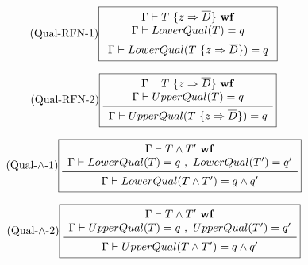 \vspace{0.4cm}

\begin{equation*}\tag{Qual-RFN-1}\label{equ-qual-rfn-1}
\boxed{
\begin{array}{c}
\Gamma \vdash T\ \{ z \Rightarrow \overline{D} \}\ {\bf wf} \\
\Gamma \vdash LowerQual(T) = q \\
\midrule
\Gamma \vdash LowerQual(T\ \{ z \Rightarrow \overline{D} \}) = q \\
\end{array}
}
\end{equation*}

\vspace{0.4cm}

\begin{equation*}\tag{Qual-RFN-2}\label{equ-qual-rfn-2}
\boxed{
\begin{array}{c}
\Gamma \vdash T\ \{ z \Rightarrow \overline{D} \}\ {\bf wf} \\
\Gamma \vdash UpperQual(T) = q \\
\midrule
\Gamma \vdash UpperQual(T\ \{ z \Rightarrow \overline{D} \}) = q \\
\end{array}
}
\end{equation*}

\vspace{0.4cm}

\begin{equation*}\tag{\mbox{Qual-$\land$-1}}\label{equ-qual-meet-1}
\boxed{
\begin{array}{c}
\Gamma \vdash T \land T'\ {\bf wf} \\
\Gamma \vdash LowerQual(T) = q\ ,\ LowerQual(T') = q' \\
\midrule
\Gamma \vdash LowerQual(T \land T') = q \land q' \\
\end{array}
}
\end{equation*}

\vspace{0.4cm}

\begin{equation*}\tag{\mbox{Qual-$\land$}-2}\label{equ-qual-meet-2}
\boxed{
\begin{array}{c}
\Gamma \vdash T \land T'\ {\bf wf} \\
\Gamma \vdash UpperQual(T) = q\ ,\ UpperQual(T') = q' \\
\midrule
\Gamma \vdash UpperQual(T \land T') = q \land q' \\
\end{array}
}
\end{equation*}

